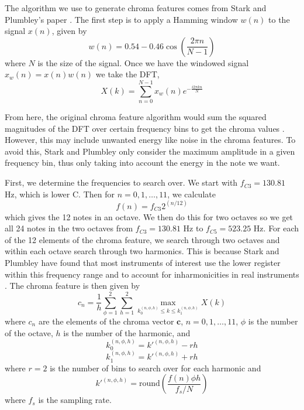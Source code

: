 \documentclass[journal]{IEEEtran}
\begin{document}
The algorithm we use to generate chroma features comes from Stark and Plumbley’s paper \cite{stark}.
The first step is to apply a Hamming window $w(n)$ to the signal $x(n)$, given by
\begin{equation}
    w(n) = 0.54 - 0.46\cos\!\left(\frac{2\pi n}{N - 1}\right)
    \label{eq:window}
\end{equation}
where $N$ is the size of the signal.
Once we have the windowed signal $x_w(n) = x(n)w(n)$ we take the DFT,
\begin{equation}
    X(k) = \sum_{n = 0}^{N - 1}x_w(n)e^{-\frac{i2\pi kn}{N}}
    \label{eq:dft}
\end{equation}

From here, the original chroma feature algorithm would sum the squared magnitudes of the DFT over certain frequency bins to get the chroma values \cite{fujishima}.
However, this may include unwanted energy like noise in the chroma features.
To avoid this, Stark and Plumbley only consider the maximum amplitude in a given frequency bin, thus only taking into account the energy in the note we want.

First, we determine the frequencies to search over.
We start with $f_{C3} = 130.81$ Hz, which is lower C.
Then for $n = 0, 1, \ldots, 11$, we calculate
\begin{equation}
    f(n) = f_{C3}2^{(n / 12)}
    \label{eq:freq}
\end{equation}
which gives the 12 notes in an octave.
We then do this for two octaves so we get all 24 notes in the two octaves from $f_{C3} = 130.81$ Hz to $f_{C5} = 523.25$ Hz.
For each of the 12 elements of the chroma feature, we search through two octaves and within each octave search through two harmonics.
This is because Stark and Plumbley have found that most instruments of interest use the lower register within this frequency range and to account for inharmonicities in real instruments \cite{stark}.
The chroma feature is then given by
\begin{equation}
    c_n = \frac{1}{h}\sum_{\phi = 1}^2\sum_{h = 1}^2 \max_{k_0^{(n, \phi, h)} \leq k \leq k_1^{(n, \phi, h)}} X(k)
    \label{eq:chroma}
\end{equation}
where $c_n$ are the elements of the chroma vector $\mathbf{c}$, $n = 0, 1, \ldots, 11$, $\phi$ is the number of the octave, $h$ is the number of the harmonic, and 
\begin{equation*}
    k_0^{(n, \phi, h)} = k'^{(n, \phi, h)} - rh
\end{equation*}
\begin{equation*}
    k_1^{(n, \phi, h)} = k'^{(n, \phi, h)} + rh
\end{equation*}
where $r = 2$ is the number of bins to search over for each harmonic and 
\begin{equation*}
    k'^{(n, \phi, h)} = \text{round}\!\left(\frac{f(n)\phi h}{f_s / N}\right)
\end{equation*}
where $f_s$ is the sampling rate.
\end{document}
